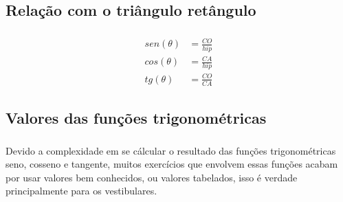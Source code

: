 \documentclass[handout]{beamer}
\begin{document}
\begin{frame}[fragile]\frametitle{\subsecname}
    \begin{figure}[H]
        \centering
    \end{figure}

\end{frame}


\subsection{Relação com o triângulo retângulo}
\begin{frame}\frametitle{\subsecname}
    
    \begin{align}
        sen(\theta) & = \frac{CO}{hip} \\[1ex]
        cos(\theta) & = \frac{CA}{hip} \\[1ex]
        tg(\theta)  & = \frac{CO}{CA}
    \end{align}

\end{frame}


\subsection{Valores das funções trigonométricas}
\begin{frame}\frametitle{\subsecname}

    Devido a complexidade em se cálcular o resultado das funções trigonométricas
    seno, cosseno e tangente, muitos exercícios que envolvem essas funções acabam
    por usar valores bem conhecidos, ou valores tabelados, isso é verdade
    principalmente para os vestibulares.
    
\end{frame}
\end{document}
